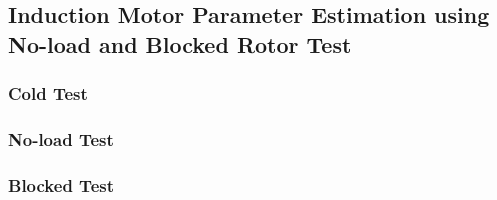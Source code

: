 \subsection{Induction Motor Parameter Estimation using No-load and Blocked Rotor Test}


\subsubsection{Cold Test}

\subsubsection{No-load Test}

\subsubsection{Blocked Test}


\newpage